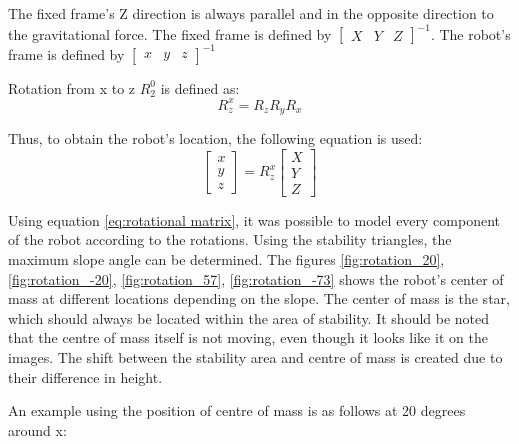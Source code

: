 The fixed frame's Z direction is always parallel and in the opposite direction to the gravitational force. The fixed frame is defined by $\left[ \begin{array}{ccc} X & Y & Z \end{array} \right]^{-1}$. The robot's frame is defined by $\left[ \begin{array}{ccc} x & y & z \end{array} \right]^{-1}$

Rotation from x to z $R_2^0$ is defined as:
\begin{equation}
    R_z^x = R_zR_yR_x
\end{equation}

Thus, to obtain the robot's location, the following equation is used:
\begin{equation} \label{eq:rotational matrix}
    \left[ \begin{array}{ccc} x \\ y \\ z \end{array} \right] = 
    R_z^x
    \left[ \begin{array}{ccc} X \\ Y \\ Z \end{array} \right]
\end{equation}

Using equation \ref{eq:rotational matrix}, it was possible to model every component of the robot according to the rotations. Using the stability triangles, the maximum slope angle can be determined. The  figures \ref{fig:rotation_20}, \ref{fig:rotation_-20}, \ref{fig:rotation_57}, \ref{fig:rotation_-73} shows the robot's center of mass at different locations depending on the slope. The center of mass is the star, which should always be located within the area of stability. It should be noted that the centre of mass itself is not moving, even though it looks like it on the images. The shift between the stability area and centre of mass is created due to their difference in height.

An example using the position of centre of mass is as follows at 20 degrees around x:

